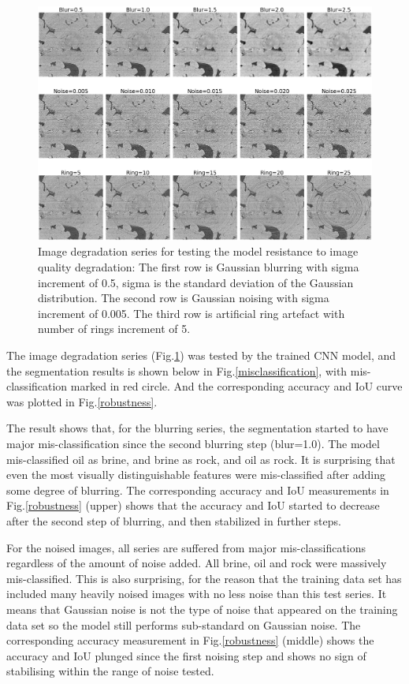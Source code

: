 \documentclass[draft,linenumbers]{agujournal2018}
\begin{document}
\begin{figure}[h]
 \centering
 \includegraphics[width=33pc]{imgs/01dec_noisetest3}
 \caption{Image degradation series for testing the model resistance to image quality degradation: The first row is Gaussian blurring with sigma increment of 0.5, sigma is the standard deviation of the Gaussian distribution. The second row is Gaussian noising with sigma increment of 0.005. The third row is artificial ring artefact with number of rings increment of 5.}
 \label{noisetest}
 \end{figure}
 
 The image degradation series (Fig.\ref{noisetest}) was tested by the trained CNN model, and the segmentation results is shown below in Fig.\ref{misclassification}, with mis-classification marked in red circle. And the corresponding accuracy and IoU curve was plotted in Fig.\ref{robustness}.
 
 The result shows that, for the blurring series, the segmentation started to have major mis-classification since the second blurring step (blur=1.0). The model mis-classified oil as brine, and brine as rock, and oil as rock. It is surprising that even the most visually distinguishable features were mis-classified after adding some degree of blurring. The corresponding accuracy and IoU measurements in Fig.\ref{robustness} (upper) shows that the accuracy and IoU started to decrease after the second step of blurring, and then stabilized in further steps.
 
 For the noised images, all series are suffered from major mis-classifications regardless of the amount of noise added. All brine, oil and rock were massively mis-classified. This is also surprising, for the reason that the training data set has included many heavily noised images with no less noise than this test series. It means that Gaussian noise is not the type of noise that appeared on the training data set so the model still performs sub-standard on Gaussian noise. The corresponding accuracy measurement in Fig.\ref{robustness} (middle) shows the accuracy and IoU plunged since the first noising step and shows no sign of stabilising within the range of noise tested.
 
\end{document}
